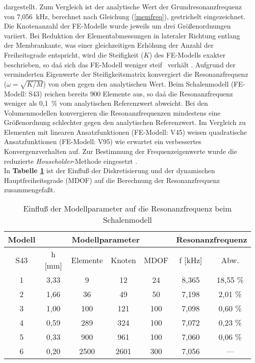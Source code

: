 dargestellt. Zum Vergleich ist der analytische Wert der
Grundresonanzfrequenz von 7,056~kHz, berechnet nach Gleichung
(\ref{memfreq}), gestrichelt eingezeichnet. Die Knotenanzahl
der FE-Modelle wurde jeweils um drei Größenordnungen variiert.
Bei Reduktion der Elementabmessungen in lateraler Richtung entlang der
Membrankante, was einer gleichzeitigen Erhöhung der Anzahl der
Freiheitsgrade entspricht, wird die Steifigkeit ($K$) des FE-Modells
exakter beschrieben, so daá sich das FE-Modell weniger \glqq steif\grqq
\, verhält \cite{Zie84}. Aufgrund der verminderten Eigenwerte der
Steifigkeitsmatrix konvergiert die Resonanzfrequenz ($\omega = \sqrt{K/M}$)
von oben gegen den analytischen Wert.
Beim Schalenmodell (FE-Modell: S43) reichen bereits 900 Elemente aus,
so daá die Resonanzfrequenz weniger als 0,1~\% vom analytischen
Referenzwert abweicht. Bei den Volumenmodellen konvergieren die
Resonanzfrequenzen mindestens eine Größenordnung schlechter gegen
den analytischen Referenzwert. Im Vergleich zu Elementen mit
linearen Ansatzfunktionen (FE-Modell: V45) weisen quadratische
Ansatzfunktionen (FE-Modell: V95) wie erwartet ein verbessertes
Konvergenzverhalten auf.
Zur Bestimmung der Frequenzeigenwerte wurde die reduzierte
{\sl Householder}-Methode eingesetzt \cite{Koh92}.\\
In {\bf Tabelle \ref{tabdiskfreq}}
ist der Einfluß der Diskretisierung und der dynamischen Hauptfreiheitsgrade
(MDOF) auf die Berechnung der Resonanzfrequenz zusammengefaßt.
\begin{table}[htb]
\caption{\label{tabdiskfreq}
 Einfluß der Modellparameter auf die Resonanzfrequenz beim Schalenmodell}
\begin{center}
\begin{tabular} {|c||c|c|c|c||c|c|}
\hline
Modell & \multicolumn{4}{c||}{Modellparameter}
       & \multicolumn{2}{c|}{Resonanzfrequenz} \\
\hline
S43 & h [mm] & Elemente & Knoten & MDOF & f [kHz] & Abw. \\
\hline \hline
1  & 3,33 &    9  &    12 &  24 & 8,365 & 18,55 \% \\
2  & 1,66 &   36  &    49 &  50 & 7,198 &  2,01 \% \\
3  & 1,00 &  100  &   121 & 100 & 7,098 &  0,60 \% \\
4  & 0,59 &  289  &   324 & 100 & 7,072 &  0,23 \% \\
5  & 0,33 &  900  &   961 & 100 & 7,060 &  0,06 \% \\
6  & 0,20 & 2500  &  2601 & 300 & 7,056 &  --- \\
\hline
\end{tabular}\\
\end{center}
\end{table}
